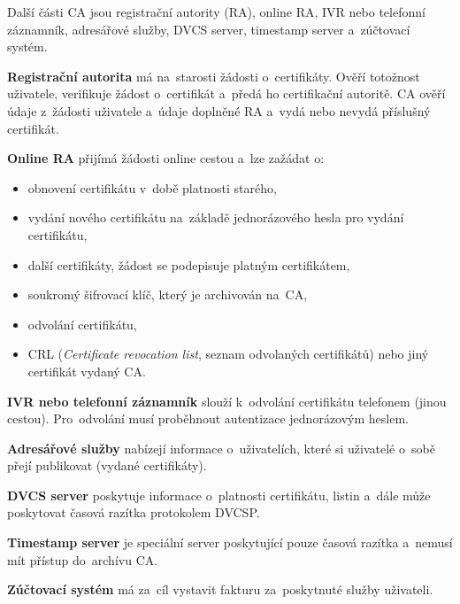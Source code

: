 Další části CA jsou registrační autority (RA), online RA, IVR nebo telefonní záznamník, adresářové služby, DVCS server, timestamp server a~zúčtovací systém.

\textbf{Registrační autorita} má na~starosti žádosti o~certifikáty. Ověří totožnost uživatele, verifikuje žádost o~certifikát a~předá ho certifikační autoritě. CA ověří údaje z~žádosti uživatele a~údaje doplněné RA a~vydá nebo nevydá příslušný certifikát.
 
\textbf{Online RA} přijímá žádosti online cestou a~lze zažádat o:
\begin{itemize}
    \item obnovení certifikátu v~době platnosti starého,
    \item vydání nového certifikátu na~základě jednorázového hesla pro vydání~ certifikátu,
    \item další certifikáty, žádost se podepisuje platným certifikátem,
    \item soukromý šifrovací klíč, který je archivován na~CA,
    \item odvolání certifikátu,
    \item CRL (\emph{Certificate revocation list}, seznam odvolaných certifikátů) nebo jiný certifikát vydaný CA.
\end{itemize}

\textbf{IVR nebo telefonní záznamník} slouží k~odvolání certifikátu telefonem (jinou cestou). Pro~odvolání musí proběhnout autentizace jednorázovým heslem.

\textbf{Adresářové služby} nabízejí informace o~uživatelích, které si uživatelé o~sobě přejí publikovat (vydané certifikáty).

\textbf{DVCS server} poskytuje informace o~platnosti certifikátu, listin a~dále může poskytovat časová razítka protokolem DVCSP.

\textbf{Timestamp server} je speciální server poskytující pouze časová razítka a~nemusí mít přístup do~archívu CA.

\textbf{Zúčtovací systém} má za~cíl vystavit fakturu za~poskytnuté služby uživateli.

